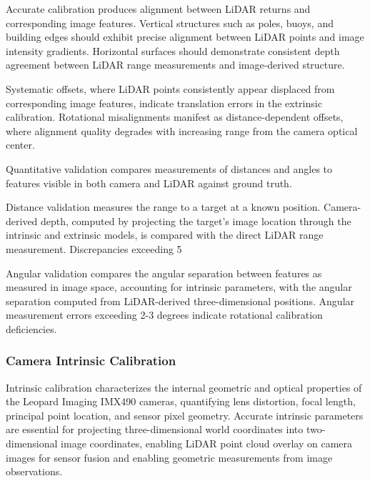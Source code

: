 Accurate calibration produces alignment between LiDAR returns and corresponding image features.
Vertical structures such as poles, buoys, and building edges should exhibit precise alignment between LiDAR points and image intensity gradients.
Horizontal surfaces should demonstrate consistent depth agreement between LiDAR range measurements and image-derived structure.

Systematic offsets, where LiDAR points consistently appear displaced from corresponding image features, indicate translation errors in the extrinsic calibration.
Rotational misalignments manifest as distance-dependent offsets, where alignment quality degrades with increasing range from the camera optical center.


Quantitative validation compares measurements of distances and angles to features visible in both camera and LiDAR against ground truth.

Distance validation measures the range to a target at a known position.
Camera-derived depth, computed by projecting the target's image location through the intrinsic and extrinsic models, is compared with the direct LiDAR range measurement.
Discrepancies exceeding 5%

Angular validation compares the angular separation between features as measured in image space, accounting for intrinsic parameters, with the angular separation computed from LiDAR-derived three-dimensional positions.
Angular measurement errors exceeding 2-3 degrees indicate rotational calibration deficiencies.

\subsubsection{Camera Intrinsic Calibration} \label{HDR_intrinsic}


Intrinsic calibration characterizes the internal geometric and optical properties of the Leopard Imaging IMX490 cameras, quantifying lens distortion, focal length, principal point location, and sensor pixel geometry.
Accurate intrinsic parameters are essential for projecting three-dimensional world coordinates into two-dimensional image coordinates, enabling LiDAR point cloud overlay on camera images for sensor fusion and enabling geometric measurements from image observations.

